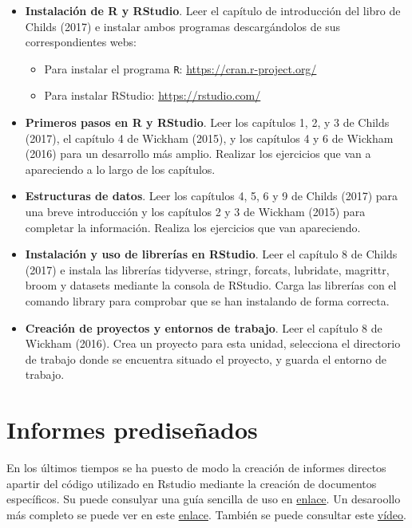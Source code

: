 \documentclass[
]{book}
\providecommand{\tightlist}{%
  \setlength{\itemsep}{0pt}\setlength{\parskip}{0pt}}
\begin{document}
\begin{itemize}
\item
  \textbf{Instalación de R y RStudio}. Leer el capítulo de introducción del libro de Childs (2017) e instalar ambos programas descargándolos de sus correspondientes webs:

  \begin{itemize}
  \tightlist
  \item
    Para instalar el programa \texttt{R}: \url{https://cran.r-project.org/}
  \item
    Para instalar RStudio: \url{https://rstudio.com/}
  \end{itemize}
\item
  \textbf{Primeros pasos en R y RStudio}. Leer los capítulos 1, 2, y 3 de Childs (2017), el capítulo 4 de Wickham (2015), y los capítulos 4 y 6 de Wickham (2016) para un desarrollo más amplio. Realizar los ejercicios que van a apareciendo a lo largo de los capítulos.
\item
  \textbf{Estructuras de datos}. Leer los capítulos 4, 5, 6 y 9 de Childs (2017) para una breve introducción y los capítulos 2 y 3 de Wickham (2015) para completar la información. Realiza los ejercicios que van apareciendo.
\item
  \textbf{Instalación y uso de librerías en RStudio}. Leer el capítulo 8 de Childs (2017) e instala las librerías tidyverse, stringr, forcats, lubridate, magrittr, broom y datasets mediante la consola de RStudio. Carga las librerías con el comando library para comprobar que se han instalando de forma correcta.
\item
  \textbf{Creación de proyectos y entornos de trabajo}. Leer el capítulo 8 de Wickham (2016). Crea un proyecto para esta unidad, selecciona el directorio de trabajo donde se encuentra situado el proyecto, y guarda el entorno de trabajo.
\end{itemize}

\hypertarget{informes-prediseuxf1ados}{%
\section{Informes prediseñados}\label{informes-prediseuxf1ados}}

En los últimos tiempos se ha puesto de modo la creación de informes directos apartir del código utilizado en Rstudio mediante la creación de documentos específicos. Su puede consulyar una guía sencilla de uso en \href{http://www.unavarra.es/personal/tgoicoa/ESTADISTICA_RMarkdown_tomas/basicRmarkdown/index.html}{enlace}. Un desaroollo más completo se puede ver en este \href{https://bookdown.org/yihui/rmarkdown/}{enlace}. También se puede consultar este \href{https://www.youtube.com/watch?v=V0eJE55aTrY}{vídeo}.
\end{document}
